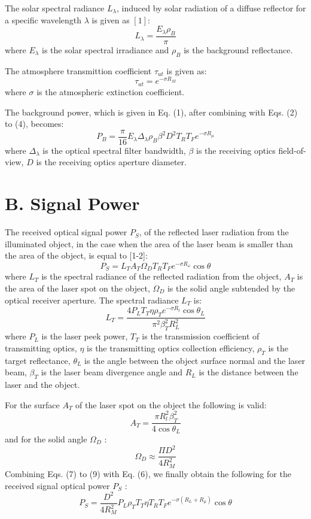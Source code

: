 \documentclass[10pt]{article}
\begin{document}
The solar spectral radiance \(L_{\lambda}\), induced by solar radiation of a diffuse reflector for a specific wavelength \(\lambda\) is given as \([1]:\)
\[
L_{\lambda}=\frac{E_{\lambda} \rho_{B}}{\pi}
\]
where \(E_{\lambda}\) is the solar spectral irradiance and \(\rho_{B}\) is the background reflectance.

The atmosphere transmittion coefficient \(\tau_{u t}\) is given as:
\[
\tau_{a t}=e^{-\sigma R_{M}}
\]
where \(\sigma\) is the atmospheric extinction coefficient.

The background power, which is given in Eq. (1), after combining with Eqs. (2) to (4), becomes:
\[
P_{B}=\frac{\pi}{16} E_{\lambda} \Delta_{\lambda} \rho_{B} \beta^{2} D^{2} T_{R} T_{F} e^{-\sigma R_{\mu}}
\]
where \(\Delta_{\lambda}\) is the optical spectral filter bandwidth, \(\beta\) is the receiving optics field-of-view, \(D\) is the receiving optics aperture diameter.

\section{B. Signal Power}
The received optical signal power \(P_{S}\), of the reflected laser radiation from the illuminated object, in the case when the area of the laser beam is smaller than the area of the object, is equal to [1-2]:
\[
P_{S}=L_{T} A_{T} \Omega_{D} T_{R} T_{F} e^{-\sigma R_{\omega}} \cos \theta
\]
where \(L_{T}\) is the spectral radiance of the reflected radiation from the object, \(A_{T}\) is the area of the laser spot on the object, \(\Omega_{D}\) is the solid angle subtended by the optical receiver aperture. The spectral radiance \(L_{T}\) is:
\[
L_{T}=\frac{4 P_{L} T_{T} \eta \rho_{T} e^{-\sigma R_{t}} \cos \theta_{L}}{\pi^{2} \beta_{T}^{2} R_{L}^{2}}
\]
where \(P_{L}\) is the laser peek power, \(T_{T}\) is the transmission coefficient of transmitting optics, \(\eta\) is the transmitting optics collection efficiency, \(\rho_{T}\) is the target reflectance, \(\theta_{L}\) is the angle between the object surface normal and the laser beam, \(\beta_{T}\) is the laser beam divergence angle and \(R_{L}\) is the distance between the laser and the object.

For the surface \(A_{T}\) of the laser spot on the object the following is valid:
\[
A_{T}=\frac{\pi R_{l}^{2} \beta_{T}^{2}}{4 \cos \theta_{L}}
\]
and for the solid angle \(\Omega_{D}\) :
\[
\Omega_{D} \approx \frac{\Pi D^{2}}{4 R_{M}^{2}}
\]
Combining Eqs. (7) to (9) with Eq. (6), we finally obtain the following for the received signal optical power \(P_{S}\) :
\[
P_{S}=\frac{D^{2}}{4 R_{M}^{2}} P_{L} \rho_{T} T_{T} \eta T_{R} T_{F} e^{-\sigma\left(R_{L}+R_{\mu}\right)} \cos \theta
\]
\end{document}
